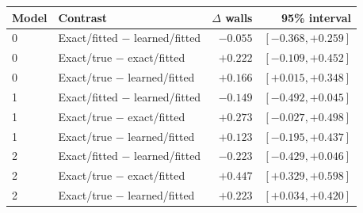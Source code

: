 \begin{tabular}{llrr}
\toprule
\rowcolor{Navy!8}
Model & Contrast & $\Delta$ walls & 95\% interval \\
\midrule
0 & Exact/fitted $-$ learned/fitted & $-0.055$ & $[-0.368,+0.259]$ \\
0 & Exact/true $-$ exact/fitted & $+0.222$ & $[-0.109,+0.452]$ \\
0 & Exact/true $-$ learned/fitted & $+0.166$ & $[+0.015,+0.348]$ \\
1 & Exact/fitted $-$ learned/fitted & $-0.149$ & $[-0.492,+0.045]$ \\
1 & Exact/true $-$ exact/fitted & $+0.273$ & $[-0.027,+0.498]$ \\
1 & Exact/true $-$ learned/fitted & $+0.123$ & $[-0.195,+0.437]$ \\
2 & Exact/fitted $-$ learned/fitted & $-0.223$ & $[-0.429,+0.046]$ \\
2 & Exact/true $-$ exact/fitted & $+0.447$ & $[+0.329,+0.598]$ \\
2 & Exact/true $-$ learned/fitted & $+0.223$ & $[+0.034,+0.420]$ \\
\bottomrule
\end{tabular}

